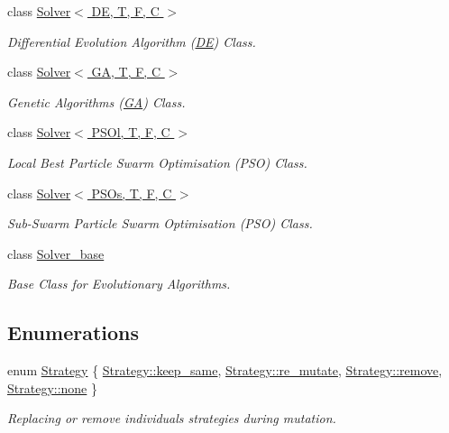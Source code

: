 \begin{DoxyCompactItemize}
class \hyperlink{classea_1_1_solver_3_01_d_e_00_01_t_00_01_f_00_01_c_01_4}{Solver$<$ D\+E, T, F, C $>$}
\begin{DoxyCompactList}\small\item\em Differential Evolution Algorithm (\hyperlink{structea_1_1_d_e}{DE}) Class. \end{DoxyCompactList}\item 
class \hyperlink{classea_1_1_solver_3_01_g_a_00_01_t_00_01_f_00_01_c_01_4}{Solver$<$ G\+A, T, F, C $>$}
\begin{DoxyCompactList}\small\item\em Genetic Algorithms (\hyperlink{structea_1_1_g_a}{GA}) Class. \end{DoxyCompactList}\item 
class \hyperlink{classea_1_1_solver_3_01_p_s_ol_00_01_t_00_01_f_00_01_c_01_4}{Solver$<$ P\+S\+Ol, T, F, C $>$}
\begin{DoxyCompactList}\small\item\em Local Best Particle Swarm Optimisation (P\+SO) Class. \end{DoxyCompactList}\item 
class \hyperlink{classea_1_1_solver_3_01_p_s_os_00_01_t_00_01_f_00_01_c_01_4}{Solver$<$ P\+S\+Os, T, F, C $>$}
\begin{DoxyCompactList}\small\item\em Sub-\/\+Swarm Particle Swarm Optimisation (P\+SO) Class. \end{DoxyCompactList}\item 
class \hyperlink{classea_1_1_solver__base}{Solver\+\_\+base}
\begin{DoxyCompactList}\small\item\em Base Class for Evolutionary Algorithms. \end{DoxyCompactList}\end{DoxyCompactItemize}
\subsection*{Enumerations}
\begin{DoxyCompactItemize}
\item 
enum \hyperlink{namespaceea_a8e369877773b4db67b8512efdb4f8f89}{Strategy} \{ \hyperlink{namespaceea_a8e369877773b4db67b8512efdb4f8f89ac4a301043ce8554dfced7a0c0698bdad}{Strategy\+::keep\+\_\+same}, 
\hyperlink{namespaceea_a8e369877773b4db67b8512efdb4f8f89a49a303c9c8d8a0c15a7fc97cd4b1db0d}{Strategy\+::re\+\_\+mutate}, 
\hyperlink{namespaceea_a8e369877773b4db67b8512efdb4f8f89a0f6969d7052da9261e31ddb6e88c136e}{Strategy\+::remove}, 
\hyperlink{namespaceea_a8e369877773b4db67b8512efdb4f8f89a334c4a4c42fdb79d7ebc3e73b517e6f8}{Strategy\+::none}
 \}\begin{DoxyCompactList}\small\item\em Replacing or remove individuals strategies during mutation. \end{DoxyCompactList}
\end{DoxyCompactItemize}
